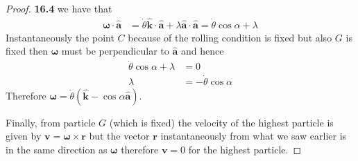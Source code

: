\documentclass[11pt]{article}
\newcommand{\hatk}{\bm{\hat{k}}}
\theoremstyle{definition}
\begin{document}
\begin{proof}{\textbf{16.4}}
    we have that
    \begin{align*}
        \bm{\omega} \cdot \bm{\hat{a}}
        &= \dot{\theta}\hatk\cdot \bm{\hat{a}}
        + \lambda\bm{\hat{a}} \cdot \bm{\hat{a}}
        = \dot{\theta}\cos\alpha + \lambda
    \end{align*}
    Instantaneously the point $C$ because of the rolling condition is fixed
    but also $G$ is fixed then $\bm\omega$ must be perpendicular to
    $\bm{\hat{a}}$ and hence
    \begin{align*}
        \dot{\theta}\cos\alpha + \lambda &= 0\\
        \lambda &= -\dot{\theta}\cos\alpha
    \end{align*}
    Therefore $\bm\omega = \dot{\theta}(\hatk - \cos\alpha \bm{\hat{a}})$.

    Finally, from particle $G$ (which is fixed) the velocity of the highest
    particle is given by $\bm{v} = \bm\omega \times \bm{r}$
    but the vector $\bm{r}$ instantaneously from what we saw earlier
    is in the same direction as $\bm\omega$ therefore
    $\bm{v} = 0$ for the highest particle.
\end{proof}
\end{document}
